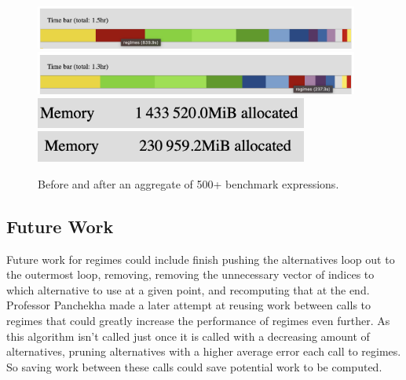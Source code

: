\documentclass{article}
\begin{document}
\begin{figure}[htbp]
\begin{center}
\includegraphics[width=0.95\textwidth]{regimes-before.png}
\includegraphics[width=0.95\textwidth]{regimes-after.png}
\includegraphics[width=0.80\textwidth]{memory-before.png}
\includegraphics[width=0.80\textwidth]{memory-after.png}
\caption{Before and after an aggregate of 500+ benchmark expressions.}
\label{fig:before-after} 
\end{center}
\end{figure}

\subsection{Future Work}

Future work for regimes could include finish pushing the alternatives loop out to the outermost loop, removing, removing the unnecessary vector of indices to which alternative to use at a given point, and recomputing that at the end. Professor Panchekha made a later attempt at reusing work between calls to regimes that could greatly increase the performance of regimes even further. As this algorithm isn't called just once it is called with a decreasing amount of alternatives, pruning alternatives with a higher average error each call to regimes. So saving work between these calls could save potential work to be computed.
\end{document}
